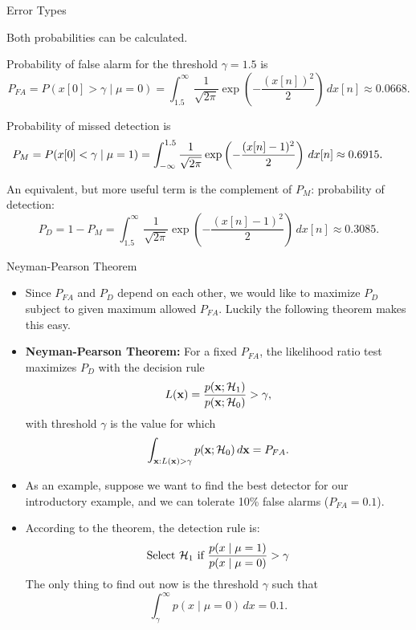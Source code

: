 \documentclass[10pt, aspectratio=169]{beamer} %
\newcommand{\x}{{\bf x}}
\begin{document}
\begin{frame}[allowframebreaks=0.8]
 {Error Types}
\begin{itemize}
{\small
\item Both probabilities can be calculated.
\item Probability of false alarm for the threshold $\gamma = 1.5$ is
\[
P_{FA} = P(x[0]>\gamma \mid \mu = 0) = \int_{1.5}^{\infty} \frac{1}{\sqrt{2\pi}}\exp\left(-\frac{(x[n])^2}{2}\right)\,dx[n]\approx 0.0668.
\]
\item Probability of missed detection is
\[
\hspace*{-0.7cm}
P_{M} = P(x[0]<\gamma \mid \mu = 1) = \int_{-\infty}^{1.5} \frac{1}{\sqrt{2\pi}}\exp\left(-\frac{(x[n]-1)^2}{2}\right)\,dx[n] \approx 0.6915.
\]
\item An equivalent, but more useful term is the complement of $P_M$: probability of detection:
\[
P_{D} = 1 - P_M = \int_{1.5}^{\infty} \frac{1}{\sqrt{2\pi}}\exp\left(-\frac{(x[n]-1)^2}{2}\right)\,dx[n] \approx 0.3085.
\]
}
\end{itemize}
\end{frame}

\begin{frame}[allowframebreaks=0.8]
 {Neyman-Pearson Theorem}
\begin{itemize}
\item Since $P_{FA}$ and $P_D$ depend on each other, we would like to maximize
$P_D$ subject to given maximum allowed $P_{FA}$. Luckily the following theorem makes this easy.
\item \textbf{Neyman-Pearson Theorem:} For a fixed $P_{FA}$, the likelihood ratio test
maximizes $P_D$ with the decision rule
\[
L(\x) = \frac{p(\x; {\cal H}_1)}{p(\x; {\cal H}_0)} > \gamma,
\]
with threshold $\gamma$ is the value for which
\[
\int_{\x:L(\x)>\gamma} p(\x; {\cal H}_0)\, d\x = P_{FA}.
\]
\framebreak

\item As an example, suppose we want to find the best detector for our
introductory example, and we can tolerate 10\% false alarms ($P_{FA} = 0.1$).
\item According to the theorem, the detection rule is:
\[
\text{Select } {\cal H}_1 \text{ if } \frac{p(x\mid \mu=1)}{p(x\mid \mu=0)} > \gamma
\]
The only thing to find out now is the threshold $\gamma$ such that
\[
\int_{\gamma}^{\infty} p(x\mid \mu=0)\, dx = 0.1.
\]

\end{itemize}
\end{frame}
\end{document}
